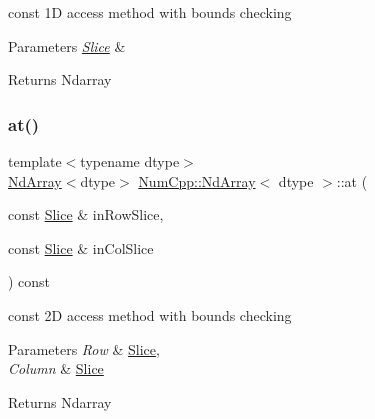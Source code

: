 const 1D access method with bounds checking


\begin{DoxyParams}{Parameters}
{\em \mbox{\hyperlink{class_num_cpp_1_1_slice}{Slice}}} & \\
\hline
\end{DoxyParams}
\begin{DoxyReturn}{Returns}
Ndarray 
\end{DoxyReturn}
\mbox{\label{class_num_cpp_1_1_nd_array_aeec406a16fda3f982fb358e910e02a80}} 
\subsubsection{\texorpdfstring{at()}{at()}\hspace{0.1cm}{\footnotesize\ttfamily [6/8]}}
{\footnotesize\ttfamily template$<$typename dtype$>$ \\
\mbox{\hyperlink{class_num_cpp_1_1_nd_array}{Nd\+Array}}$<$dtype$>$ \mbox{\hyperlink{class_num_cpp_1_1_nd_array}{Num\+Cpp\+::\+Nd\+Array}}$<$ dtype $>$\+::at (\begin{DoxyParamCaption}\item[{const \mbox{\hyperlink{class_num_cpp_1_1_slice}{Slice}} \&}]{in\+Row\+Slice,  }\item[{const \mbox{\hyperlink{class_num_cpp_1_1_slice}{Slice}} \&}]{in\+Col\+Slice }\end{DoxyParamCaption}) const\hspace{0.3cm}{\ttfamily [inline]}}

const 2D access method with bounds checking


\begin{DoxyParams}{Parameters}
{\em Row} & \mbox{\hyperlink{class_num_cpp_1_1_slice}{Slice}}, \\
\hline
{\em Column} & \mbox{\hyperlink{class_num_cpp_1_1_slice}{Slice}} \\
\hline
\end{DoxyParams}
\begin{DoxyReturn}{Returns}
Ndarray 
\end{DoxyReturn}
\mbox{\label{class_num_cpp_1_1_nd_array_a00130f153d79690e60238dc530501af5}} 
